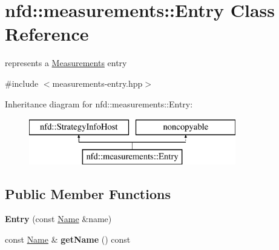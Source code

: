\hypertarget{classnfd_1_1measurements_1_1Entry}{}\section{nfd\+:\+:measurements\+:\+:Entry Class Reference}
\label{classnfd_1_1measurements_1_1Entry}


represents a \hyperlink{classnfd_1_1Measurements}{Measurements} entry  




{\ttfamily \#include $<$measurements-\/entry.\+hpp$>$}

Inheritance diagram for nfd\+:\+:measurements\+:\+:Entry\+:\begin{figure}[H]
\begin{center}
\leavevmode
\includegraphics[height=2.000000cm]{classnfd_1_1measurements_1_1Entry}
\end{center}
\end{figure}
\subsection*{Public Member Functions}
\begin{DoxyCompactItemize}
\item 
{\bfseries Entry} (const \hyperlink{classndn_1_1Name}{Name} \&name)\hypertarget{classnfd_1_1measurements_1_1Entry_aba802384caa13772d1a6ed993f7d7dc5}{}\label{classnfd_1_1measurements_1_1Entry_aba802384caa13772d1a6ed993f7d7dc5}

\item 
const \hyperlink{classndn_1_1Name}{Name} \& {\bfseries get\+Name} () const\hypertarget{classnfd_1_1measurements_1_1Entry_a00d86bcd65b6880eda3d3717d8636953}{}\label{classnfd_1_1measurements_1_1Entry_a00d86bcd65b6880eda3d3717d8636953}

\end{DoxyCompactItemize}
